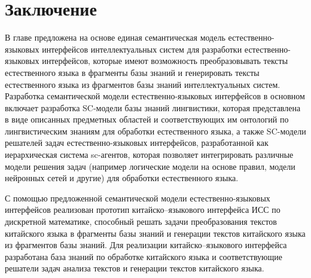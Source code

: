 \section*{Заключение}
В главе предложена на основе  единая семантическая модель естественно-языковых интерфейсов интеллектуальных систем для разработки естественно-языковых интерфейсов, которые имеют возможность преобразовывать тексты естественного языка в фрагменты базы знаний и генерировать тексты естественного языка из фрагментов базы знаний интеллектуальных систем. Разработка семантической модели естественно-языковых интерфейсов в основном включает разработка SC-модели базы знаний лингвистики, которая представлена в виде описанных предметных областей и соответствующих им онтологий по лингвистическим знаниям для обработки естественного языка, а также SC-модели решателей задач естественно-языковых интерфейсов, разработанной как иерархическая система sc-агентов, которая позволяет интегрировать различные модели решения задач (например логические модели на основе правил, модели нейронных сетей и другие) для обработки естественного языка.

С помощью предложенной семантической модели естественно-языковых интерфейсов реализован прототип китайско–языкового интерфейса ИСС по дискретной математике, способный решать задачи преобразования текстов китайского языка в фрагменты базы знаний и генерации текстов китайского языка из фрагментов базы знаний. Для реализации китайско–языкового интерфейса разработана база знаний по обработке китайского языка и соответствующие решатели задач анализа текстов и генерации текстов китайского языка.
%